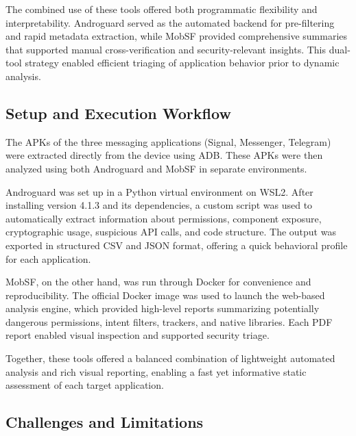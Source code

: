 \documentclass[a4paper,12pt]{report}
\begin{document}
The combined use of these tools offered both programmatic flexibility and interpretability. Androguard served as the automated backend for pre-filtering and rapid metadata extraction, while MobSF provided comprehensive summaries that supported manual cross-verification and security-relevant insights. This dual-tool strategy enabled efficient triaging of application behavior prior to dynamic analysis.



\subsection{Setup and Execution Workflow}

The APKs of the three messaging applications (Signal, Messenger, Telegram) were extracted directly from the device using ADB. These APKs were then analyzed using both Androguard and MobSF in separate environments.

Androguard was set up in a Python virtual environment on WSL2. After installing version 4.1.3 and its dependencies, a custom script was used to automatically extract information about permissions, component exposure, cryptographic usage, suspicious API calls, and code structure. The output was exported in structured CSV and JSON format, offering a quick behavioral profile for each application.

MobSF, on the other hand, was run through Docker for convenience and reproducibility. The official Docker image was used to launch the web-based analysis engine, which provided high-level reports summarizing potentially dangerous permissions, intent filters, trackers, and native libraries. Each PDF report enabled visual inspection and supported security triage.

Together, these tools offered a balanced combination of lightweight automated analysis and rich visual reporting, enabling a fast yet informative static assessment of each target application.


\subsection{Challenges and Limitations}
\end{document}
